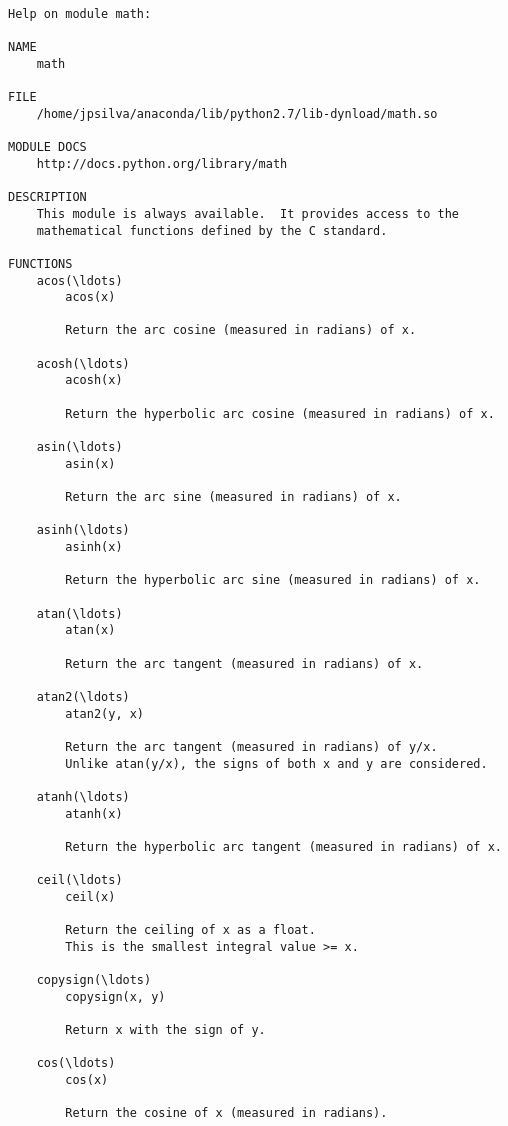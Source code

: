 \documentclass{article}
\begin{document}
    \begin{Verbatim}[commandchars=\\\{\}]
Help on module math:

NAME
    math

FILE
    /home/jpsilva/anaconda/lib/python2.7/lib-dynload/math.so

MODULE DOCS
    http://docs.python.org/library/math

DESCRIPTION
    This module is always available.  It provides access to the
    mathematical functions defined by the C standard.

FUNCTIONS
    acos(\ldots)
        acos(x)
        
        Return the arc cosine (measured in radians) of x.
    
    acosh(\ldots)
        acosh(x)
        
        Return the hyperbolic arc cosine (measured in radians) of x.
    
    asin(\ldots)
        asin(x)
        
        Return the arc sine (measured in radians) of x.
    
    asinh(\ldots)
        asinh(x)
        
        Return the hyperbolic arc sine (measured in radians) of x.
    
    atan(\ldots)
        atan(x)
        
        Return the arc tangent (measured in radians) of x.
    
    atan2(\ldots)
        atan2(y, x)
        
        Return the arc tangent (measured in radians) of y/x.
        Unlike atan(y/x), the signs of both x and y are considered.
    
    atanh(\ldots)
        atanh(x)
        
        Return the hyperbolic arc tangent (measured in radians) of x.
    
    ceil(\ldots)
        ceil(x)
        
        Return the ceiling of x as a float.
        This is the smallest integral value >= x.
    
    copysign(\ldots)
        copysign(x, y)
        
        Return x with the sign of y.
    
    cos(\ldots)
        cos(x)
        
        Return the cosine of x (measured in radians).
    

\end{Verbatim}
\end{document}
